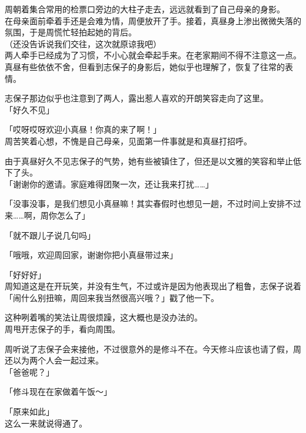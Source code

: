 周朝着集合常用的检票口旁边的大柱子走去，远远就看到了自己母亲的身影。\\

在母亲面前牵着手还是会难为情，周便放开了手。接着，真昼身上渗出微微失落的氛围，于是周慌忙轻拍起她的背后。\\

（还没告诉说我们交往，这次就原谅我吧）\\

两人牵手已经成为了习惯，不小心就会牵起手来。在老家期间不得不注意这一点。\\

真昼有些依依不舍，但看到志保子的身影后，她似乎也理解了，恢复了往常的表情。

志保子那边似乎也注意到了两人，露出惹人喜欢的开朗笑容走向了这里。\\

「好久不见」

「哎呀哎呀欢迎小真昼！你真的来了啊！」\\

周苦笑着心想，不愧是自己母亲，见面第一件事就是和真昼打招呼。

由于真昼好久不见志保子的气势，她有些被镇住了，但还是以文雅的笑容和举止低下了头。\\

「谢谢你的邀请。家庭难得团聚一次，还让我来打扰……」

「没事没事，是我们想见小真昼嘛！其实春假时也想见一趟，不过时间上安排不过来……啊，周你怎么了」

「就不跟儿子说几句吗」

「哦哦，欢迎周回家，谢谢你把小真昼带过来」

「好好好」\\

周知道这是在开玩笑，并没有生气，不过或许是因为他表现出了粗鲁，志保子说着「闹什么别扭嘛，周回来我当然很高兴哦？」戳了他一下。

这种咧着嘴的笑法让周很烦躁，这大概也是没办法的。\\

周甩开志保子的手，看向周围。

周听说了志保子会来接他，不过很意外的是修斗不在。今天修斗应该也请了假，周还以为两个人会一起过来。\\

「爸爸呢？」

「修斗现在在家做着午饭～」

「原来如此」\\

这么一来就说得通了。

